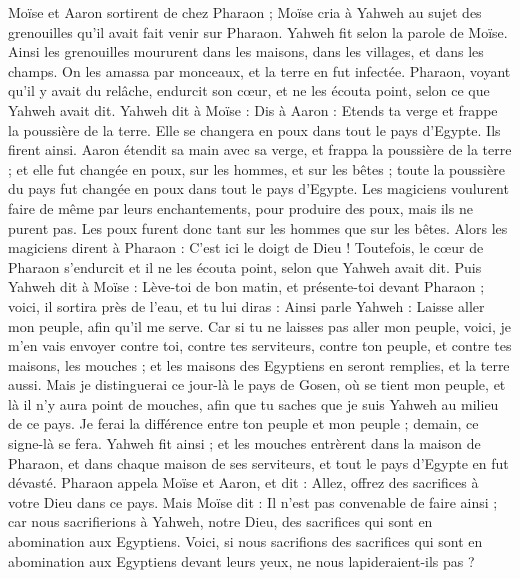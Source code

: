 \begin{multicols}{2}
Moïse et Aaron sortirent de chez Pharaon ; Moïse cria à Yahweh au sujet des grenouilles qu'il avait fait venir sur Pharaon.
Yahweh fit selon la parole de Moïse. Ainsi les grenouilles moururent dans les maisons, dans les villages, et dans les champs.
On les amassa par monceaux, et la terre en fut infectée.
Pharaon, voyant qu'il y avait du relâche, endurcit son cœur, et ne les écouta point, selon ce que Yahweh avait dit.
Yahweh dit à Moïse : Dis à Aaron : Etends ta verge et frappe la poussière de la terre. Elle se changera en poux dans tout le pays d'Egypte.
Ils firent ainsi. Aaron étendit sa main avec sa verge, et frappa la poussière de la terre ; et elle fut changée en poux, sur les hommes, et sur les bêtes ; toute la poussière du pays fut changée en poux dans tout le pays d'Egypte.
Les magiciens voulurent faire de même par leurs enchantements, pour produire des poux, mais ils ne purent pas. Les poux furent donc tant sur les hommes que sur les bêtes.
Alors les magiciens dirent à Pharaon : C'est ici le doigt de Dieu ! Toutefois, le cœur de Pharaon s'endurcit et il ne les écouta point, selon que Yahweh avait dit.
Puis Yahweh dit à Moïse : Lève-toi de bon matin, et présente-toi devant Pharaon ; voici, il sortira près de l'eau, et tu lui diras : Ainsi parle Yahweh : Laisse aller mon peuple, afin qu'il me serve.
Car si tu ne laisses pas aller mon peuple, voici, je m'en vais envoyer contre toi, contre tes serviteurs, contre ton peuple, et contre tes maisons, les mouches ; et les maisons des Egyptiens en seront remplies, et la terre aussi.
Mais je distinguerai ce jour-là le pays de Gosen, où se tient mon peuple, et là il n’y aura point de mouches, afin que tu saches que je suis Yahweh au milieu de ce pays.
Je ferai la différence entre ton peuple et mon peuple ; demain, ce signe-là se fera.
Yahweh fit ainsi ; et les mouches entrèrent dans la maison de Pharaon, et dans chaque maison de ses serviteurs, et tout le pays d'Egypte en fut dévasté.
Pharaon appela Moïse et Aaron, et dit : Allez, offrez des sacrifices à votre Dieu dans ce pays.
Mais Moïse dit : Il n'est pas convenable de faire ainsi ; car nous sacrifierions à Yahweh, notre Dieu, des sacrifices qui sont en abomination aux Egyptiens. Voici, si nous sacrifions des sacrifices qui sont en abomination aux Egyptiens devant leurs yeux, ne nous lapideraient-ils pas ?

\end{multicols}
